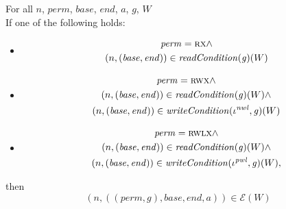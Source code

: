 \documentclass[a4paper]{article}
\newcommand{\var}[1]{\mathit{#1}}
\newcommand{\gl}{\var{g}}
\newcommand{\addr}{\var{a}}
\newcommand{\start}{\var{base}}
\newcommand{\addrend}{\var{end}}
\newcommand{\perm}{\var{perm}}
\newcommand{\nwl}{\var{nwl}}
\newcommand{\pwl}{\var{pwl}}
\newcommand{\plainfun}[2]{
  \ifthenelse{\equal{#2}{}}
  {\mathit{#1}}
  {\mathit{#1}(#2)}
}
\newcommand{\readCond}[1]{\plainfun{readCondition}{#1}}
\newcommand{\writeCond}[1]{\plainfun{writeCondition}{#1}}
\newcommand{\asmType}{\plaindom{AsmType}}
\newcommand{\plaindom}[1]{\mathrm{#1}}
\newcommand{\intr}[2]{\mathcal{#1}}
\newcommand{\exprintr}[1]{\intr{E}{#1}}
\newcommand{\stder}{\exprintr{\asmType}}
\newcommand{\npair}[2][n]{\left(#1,#2 \right)}
\newcommand{\plainperm}[1]{\textsc{#1}}
\newcommand{\exec}{\plainperm{rx}}
\newcommand{\rwx}{\plainperm{rwx}}
\newcommand{\rwlx}{\plainperm{rwlx}}
\begin{document}
\begin{theorem}
  \label{thm:ftlr}
  For all $n$, $\perm$, $\start$, $\addrend$, $\addr$, $\gl$, $W$  \\
  If one of the following holds:
  \begin{itemize}
  \item \[
      \begin{gathered}
        \perm = \exec \land\\
        \npair{(\start,\addrend)} \in \readCond{}(\gl)(W)
      \end{gathered}
    \]
  \item \[
      \begin{gathered}
        \perm = \rwx \land \\
        \npair{(\start,\addrend)} \in \readCond{}(\gl)(W) \land\\
        \npair{(\start,\addrend)} \in \writeCond{}(\iota^\nwl,\gl)(W)
      \end{gathered}
    \]
  \item \[
      \begin{gathered}
        \perm = \rwlx \land\\
        \npair{(\start,\addrend)} \in \readCond{}(\gl)(W) \land\\
        \npair{(\start,\addrend)} \in \writeCond{}(\iota^\pwl,\gl)(W),
      \end{gathered}
    \]
  \end{itemize}
  then
  \[
    \npair{((\perm,\gl),\start,\addrend,\addr)} \in \stder(W)
  \]
\end{theorem}
\end{document}
